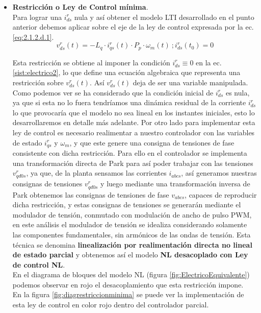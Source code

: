 \documentclass[10pt]{article}
\begin{document}
\begin{enumerate}
\begin{itemize}
	\item\textbf{ Restricción o Ley de Control mínima}.\\
	Para lograr una $i^{r}_{ds}$ nula y así obtener el modelo LTI desarrollado en el punto anterior debemos aplicar sobre el eje de la ley de control expresada por la ec. \ref{eq:2.1.2.d.1}.
	\begin{equation}
	v^{r}_{ds}(t)=-L_{q}\cdot i^{r}_{qs}(t)\cdot P_{p}\cdot \omega_{m}(t)\ ; i^{r}_{ds}(t_{0})=0
	\label{eq:2.1.2.d.1}
	\end{equation}
	
	Esta restricción se obtiene al imponer la condición $i^{r}_{ds}\equiv 0$ en la ec.\ref{sist:electrico2}, lo que define una ecuación algebraica que representa una restricción sobre $v^{r}_{ds}(t)$.
	Así $v^{r}_{ds}(t)$ deja de ser una variable manipulada. Como podemos ver se ha considerado que la condición inicial de $i^{r}_{ds}$ es nula, ya que si esta no lo fuera tendríamos una dinámica residual de la corriente $i^{r}_{ds}$ lo que provocaría que el modelo no sea lineal en los instantes iniciales, esto lo desarrollaremos en detalle más adelante.
	Por otro lado para implementar esta ley de control es necesario realimentar a nuestro controlador con las variables de estado $i^{r}_{qs}$ y $\omega_{m}$, y que este genere una consigna de tensiones de fase consistente con dicha restricción.
	Para ello en el controlador se implementa una transformación directa de Park para así poder trabajar con las tensiones $v^{r}_{qd0s}$, ya que, de la planta sensamos las corrientes $i_{abcs}$, así generamos nuestras consignas de tensiones $v^{r}_{qd0s}$ y luego mediante una transformación inversa de Park obtenemos las consignas de tensiones de fase $v_{abcs}$, capaces de reproducir dicha restricción, y estas consignas de tensiones se generarán mediante el modulador de tensión, conmutado con modulación de ancho de pulso PWM, en este análisis el modulador de tensión se idealiza considerando solamente las componentes fundamentales, sin armónicos de las ondas de tensión.
	Esta técnica se denomina \textbf{linealización por realimentación directa no lineal de estado parcial} y obtenemos así el modelo \textbf{NL desacoplado con Ley de control NL}.\\
    En el diagrama de bloques del modelo NL (figura \ref{fig:ElectricoEquivalente}) podemos observar en rojo el desacoplamiento que esta restricción impone.\\
    En la figura \ref{fig:diagrestriccionminima} se puede ver la implementación de esta ley de control en color rojo dentro del controlador parcial.


\end{itemize}
\end{enumerate}
\end{document}
